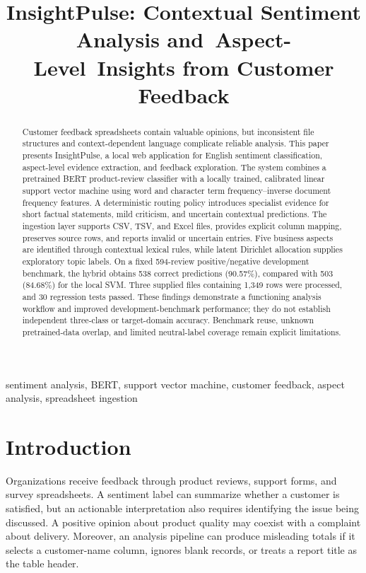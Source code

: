 \documentclass[conference,a4paper]{IEEEtran}
\begin{document}
\title{InsightPulse: Contextual Sentiment Analysis and\mbox{ Aspect-Level Insights} from Customer Feedback}
\author{
}
\maketitle

\begin{abstract}
Customer feedback spreadsheets contain valuable opinions, but inconsistent file structures and context-dependent language complicate reliable analysis. This paper presents InsightPulse, a local web application for English sentiment classification, aspect-level evidence extraction, and feedback exploration. The system combines a pretrained BERT product-review classifier with a locally trained, calibrated linear support vector machine using word and character term frequency--inverse document frequency features. A deterministic routing policy introduces specialist evidence for short factual statements, mild criticism, and uncertain contextual predictions. The ingestion layer supports CSV, TSV, and Excel files, provides explicit column mapping, preserves source rows, and reports invalid or uncertain entries. Five business aspects are identified through contextual lexical rules, while latent Dirichlet allocation supplies exploratory topic labels. On a fixed 594-review positive/negative development benchmark, the hybrid obtains 538 correct predictions (90.57\%), compared with 503 (84.68\%) for the local SVM. Three supplied files containing 1,349 rows were processed, and 30 regression tests passed. These findings demonstrate a functioning analysis workflow and improved development-benchmark performance; they do not establish independent three-class or target-domain accuracy. Benchmark reuse, unknown pretrained-data overlap, and limited neutral-label coverage remain explicit limitations.
\end{abstract}
\begin{IEEEkeywords}
sentiment analysis, BERT, support vector machine, customer feedback, aspect analysis, spreadsheet ingestion
\end{IEEEkeywords}

\section{Introduction}
Organizations receive feedback through product reviews, support forms, and survey spreadsheets. A sentiment label can summarize whether a customer is satisfied, but an actionable interpretation also requires identifying the issue being discussed. A positive opinion about product quality may coexist with a complaint about delivery. Moreover, an analysis pipeline can produce misleading totals if it selects a customer-name column, ignores blank records, or treats a report title as the table header.
\end{document}
